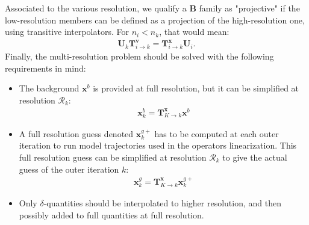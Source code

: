 \documentclass[npg, manuscript]{copernicus}
\begin{document}
Associated to the various resolution, we qualify a $\mathbf{B}$ family as "projective" if the low-resolution members can be defined as a projection of the high-resolution one, using transitive interpolators. For $n_i < n_k$, that would mean:
\begin{align}
\label{eq:projective_definition_U}
\mathbf{U}_k \mathbf{T}^\mathbf{v}_{i \rightarrow k} = \mathbf{T}^\mathbf{x}_{i \rightarrow k} \mathbf{U}_i.
\end{align}
Finally, the multi-resolution problem should be solved with the following requirements in mind:
\begin{itemize}
\item The background $\mathbf{x}^b$ is provided at full resolution, but it can be simplified at resolution $\mathcal{R}_k$:
\begin{align}
\mathbf{x}^b_k = \mathbf{T}^\mathbf{x}_{K \rightarrow k} \mathbf{x}^b
\end{align}
\item A full resolution guess denoted $\mathbf{x}^{g+}_k$ has to be computed at each outer iteration to run model trajectories used in the operators linearization. This full resolution guess can be simplified at resolution $\mathcal{R}_k$ to give the actual guess of the outer iteration $k$:
\begin{align}
\mathbf{x}^g_k = \mathbf{T}^\mathbf{x}_{K \rightarrow k} \mathbf{x}^{g+}_k
\end{align}
\item Only $\delta$-quantities should be interpolated to higher resolution, and then possibly added to full quantities at full resolution.
\end{itemize}

\end{document}
